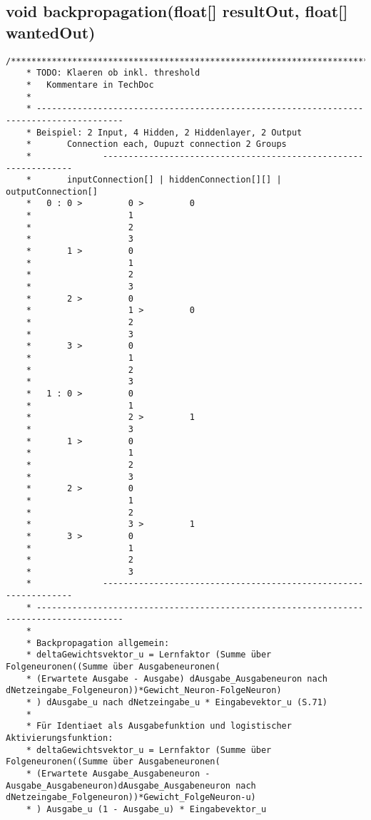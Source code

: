 \subsection{void backpropagation(float[] resultOut, float[] wantedOut)}
\begin{lstlisting}
/****************************************************************************************
	* TODO: Klaeren ob inkl. threshold
	*	Kommentare in TechDoc
	*	
	* ---------------------------------------------------------------------------------------
	* Beispiel:	2 Input, 4 Hidden, 2 Hiddenlayer, 2 Output
	*		Connection each, Oupuzt connection 2 Groups
	*              ----------------------------------------------------------------
	*		inputConnection[] | hiddenConnection[][] | outputConnection[]
	*	0 :	0 >			0 >			0
	*					1
	*					2
	*					3
	*		1 >			0
	*					1
	*					2
	*					3
	*		2 >			0
	*					1 >			0
	*					2
	*					3
	*		3 >			0
	*					1
	*					2
	*					3
	*	1 :	0 >			0
	*					1
	*					2 >			1
	*					3
	*		1 >			0
	*					1
	*					2
	*					3
	*		2 >			0
	*					1
	*					2
	*					3 >			1
	*		3 >			0
	*					1
	*					2
	*					3
	*              ----------------------------------------------------------------
	* ---------------------------------------------------------------------------------------
	*
	* Backpropagation allgemein:
	* deltaGewichtsvektor_u = Lernfaktor (Summe über Folgeneuronen((Summe über Ausgabeneuronen(
	* (Erwartete Ausgabe - Ausgabe) dAusgabe_Ausgabeneuron nach dNetzeingabe_Folgeneuron))*Gewicht_Neuron-FolgeNeuron)
	* ) dAusgabe_u nach dNetzeingabe_u * Eingabevektor_u (S.71)
	*
	* Für Identiaet als Ausgabefunktion und logistischer Aktivierungsfunktion:
	* deltaGewichtsvektor_u = Lernfaktor (Summe über Folgeneuronen((Summe über Ausgabeneuronen(
	* (Erwartete Ausgabe_Ausgabeneuron - Ausgabe_Ausgabeneuron)dAusgabe_Ausgabeneuron nach dNetzeingabe_Folgeneuron))*Gewicht_FolgeNeuron-u)
	* ) Ausgabe_u (1 - Ausgabe_u) * Eingabevektor_u
	

\end{lstlisting}
